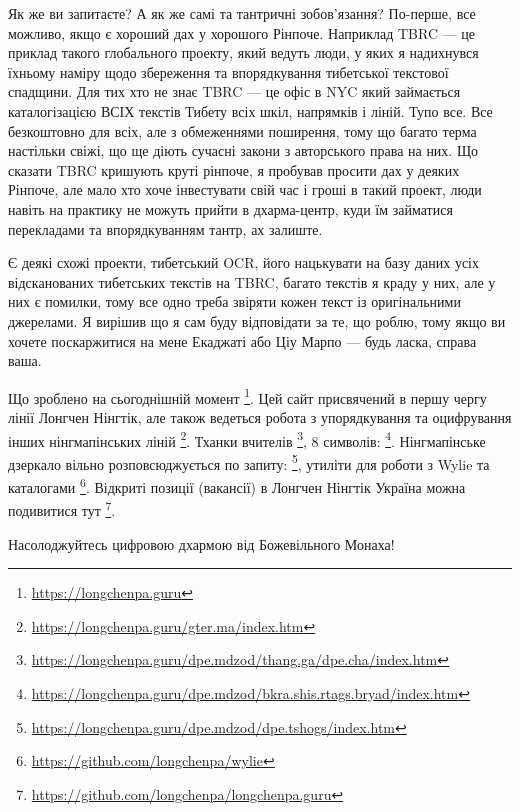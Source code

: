 Як же ви запитаєте? А як же самі та тантричні зобов'язання?
По-перше, все можливо, якщо є хороший дах у хорошого Рінпоче.
Наприклад TBRC --- це приклад такого глобального проекту, який
ведуть люди, у яких я надихнувся їхньому наміру щодо збереження
та впорядкування тибетської текстової спадщини. Для тих хто не
знає TBRC --- це офіс в NYC який займається каталогізацією ВСІХ
текстів Тибету всіх шкіл, напрямків і ліній. Тупо все. Все
безкоштовно для всіх, але з обмеженнями поширення, тому що
багато терма настільки свіжі, що ще діють сучасні закони з
авторського права на них. Що сказати TBRC кришують круті рінпоче,
я пробував просити дах у деяких Рінпоче, але мало хто хоче інвестувати
свій час і гроші в такий проект, люди навіть на практику не можуть
прийти в дхарма-центр, куди їм займатися перекладами та впорядкуванням тантр, ах залиште.

Є деякі схожі проекти, тибетський OCR,
його нацькувати на базу даних усіх відсканованих
тибетських текстів на TBRC, багато текстів я краду
у них, але у них є помилки, тому все одно
треба звіряти кожен текст із оригінальними джерелами.
Я вирішив що я сам буду відповідати за те, що роблю,
тому якщо ви хочете поскаржитися на мене Екаджаті
або Ціу Марпо --- будь ласка, справа ваша.

Що зроблено на сьогоднішній момент \footnote{\url{https://longchenpa.guru}}.
Цей сайт присвячений в першу чергу лінії Лонгчен Нінгтік,
але також ведеться робота з упорядкування та оцифрування інших
нінгмапінських ліній \footnote{\url{https://longchenpa.guru/gter.ma/index.htm}}.
Тханки вчителів \footnote{\url{https://longchenpa.guru/dpe.mdzod/thang.ga/dpe.cha/index.htm}},
8 символів: \footnote{\url{https://longchenpa.guru/dpe.mdzod/bkra.shis.rtags.bryad/index.htm}}.
Нінгмапінське дзеркало вільно розповсюджується по
запиту: \footnote{\url{https://longchenpa.guru/dpe.mdzod/dpe.tshogs/index.htm}},
утиліти для роботи з Wylie та каталогами \footnote{\url{https://github.com/longchenpa/wylie}}.
Відкриті позиції (вакансії) в Лонгчен Нінгтік Україна
можна подивитися тут \footnote{\url{https://github.com/longchenpa/longchenpa.guru}}.

Насолоджуйтесь цифровою дхармою від Божевільного Монаха!